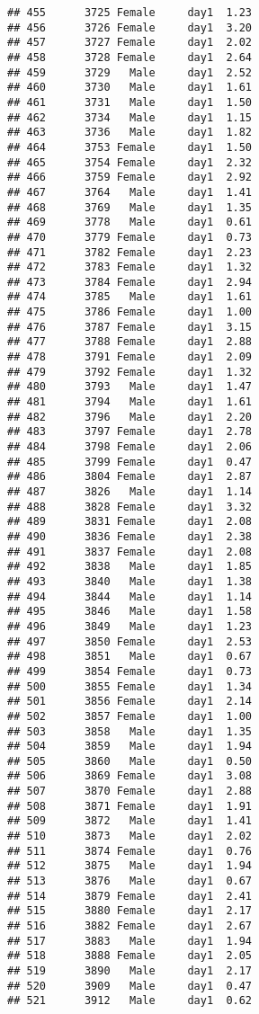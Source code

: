 \documentclass[
]{article}
\begin{document}
\begin{verbatim}
## 455      3725 Female     day1  1.23
## 456      3726 Female     day1  3.20
## 457      3727 Female     day1  2.02
## 458      3728 Female     day1  2.64
## 459      3729   Male     day1  2.52
## 460      3730   Male     day1  1.61
## 461      3731   Male     day1  1.50
## 462      3734   Male     day1  1.15
## 463      3736   Male     day1  1.82
## 464      3753 Female     day1  1.50
## 465      3754 Female     day1  2.32
## 466      3759 Female     day1  2.92
## 467      3764   Male     day1  1.41
## 468      3769   Male     day1  1.35
## 469      3778   Male     day1  0.61
## 470      3779 Female     day1  0.73
## 471      3782 Female     day1  2.23
## 472      3783 Female     day1  1.32
## 473      3784 Female     day1  2.94
## 474      3785   Male     day1  1.61
## 475      3786 Female     day1  1.00
## 476      3787 Female     day1  3.15
## 477      3788 Female     day1  2.88
## 478      3791 Female     day1  2.09
## 479      3792 Female     day1  1.32
## 480      3793   Male     day1  1.47
## 481      3794   Male     day1  1.61
## 482      3796   Male     day1  2.20
## 483      3797 Female     day1  2.78
## 484      3798 Female     day1  2.06
## 485      3799 Female     day1  0.47
## 486      3804 Female     day1  2.87
## 487      3826   Male     day1  1.14
## 488      3828 Female     day1  3.32
## 489      3831 Female     day1  2.08
## 490      3836 Female     day1  2.38
## 491      3837 Female     day1  2.08
## 492      3838   Male     day1  1.85
## 493      3840   Male     day1  1.38
## 494      3844   Male     day1  1.14
## 495      3846   Male     day1  1.58
## 496      3849   Male     day1  1.23
## 497      3850 Female     day1  2.53
## 498      3851   Male     day1  0.67
## 499      3854 Female     day1  0.73
## 500      3855 Female     day1  1.34
## 501      3856 Female     day1  2.14
## 502      3857 Female     day1  1.00
## 503      3858   Male     day1  1.35
## 504      3859   Male     day1  1.94
## 505      3860   Male     day1  0.50
## 506      3869 Female     day1  3.08
## 507      3870 Female     day1  2.88
## 508      3871 Female     day1  1.91
## 509      3872   Male     day1  1.41
## 510      3873   Male     day1  2.02
## 511      3874 Female     day1  0.76
## 512      3875   Male     day1  1.94
## 513      3876   Male     day1  0.67
## 514      3879 Female     day1  2.41
## 515      3880 Female     day1  2.17
## 516      3882 Female     day1  2.67
## 517      3883   Male     day1  1.94
## 518      3888 Female     day1  2.05
## 519      3890   Male     day1  2.17
## 520      3909   Male     day1  0.47
## 521      3912   Male     day1  0.62

\end{verbatim}
\end{document}
